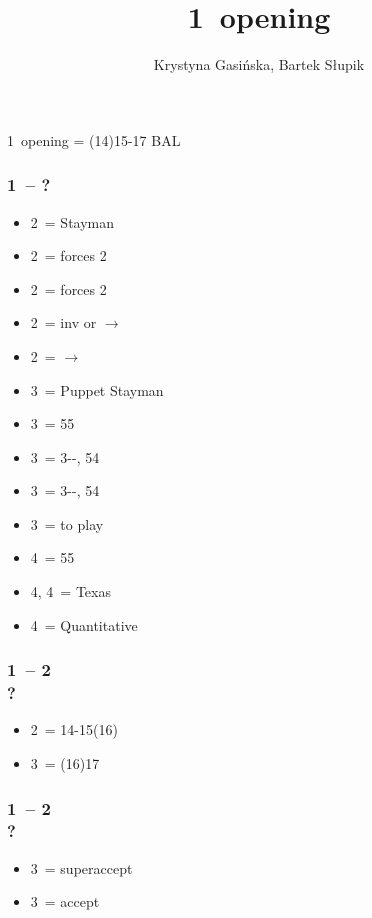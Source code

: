 \documentclass[12pt, a4paper]{article}
\title{1\ntx\ opening}
\author{Krystyna Gasińska, Bartek Słupik}
\begin{document}
\maketitle


1\nt\ opening = (14)15-17 BAL

\subsubsection*{1\ntx\ -- ?}
\begin{itemize}
    \item 2\clubs\ = Stayman
    \item 2\diams\ = forces 2\hearts
    \item 2\hearts\ = forces 2\spades
    \item 2\spades\ = inv or $\rightarrow$ \clubs
    \item 2\nt\ = $\rightarrow$ \diams
    \item 3\clubs\ = Puppet Stayman
    \item 3\diams\ = 55\minor
    \item 3\hearts\ = 3--\hearts, 54\minor
    \item 3\spades\ = 3--\spades, 54\minor
    \item 3\nt\ = to play
    \item 4\clubs\ = 55\major
    \item 4\diams, 4\hearts\ = Texas
    \item 4\nt\ = Quantitative
\end{itemize}

\subsubsection*{1\ntx\ -- 2\spades \\ ?}
\begin{itemize}
    \item 2\nt\ = 14-15(16)
    \item 3\clubs\ = (16)17
\end{itemize}

\subsubsection*{1\ntx\ -- 2\ntx \\ ?}
\begin{itemize}
    \item 3\clubs\ = superaccept
    \item 3\diams\ = accept
\end{itemize}
\end{document}
